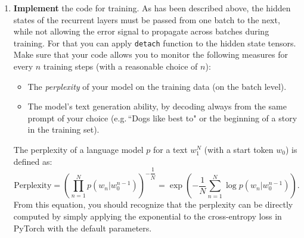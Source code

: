 \documentclass[a4paper,11pt]{article}
\begin{document}
\begin{enumerate}
\item \textbf{Implement} the code for training. As has been described above,
the hidden states of the recurrent layers must be passed from one batch to the next, while
not allowing the error signal to propagate across batches during training.
For that you can apply \texttt{detach} function to the hidden state tensors.
Make sure that your code allows you to monitor the following measures for every $n$ training steps
(with a reasonable choice of $n$):
\begin{itemize}
\item The \textit{perplexity} of your model on the training data (on the batch level).
\item The model's text generation ability, by decoding always from the same prompt of your choice
(e.g.\,``Dogs like best to" or the beginning of a story in the training set).
\end{itemize}
The perplexity of a language model $p$ for a text $w_1^N$ (with a start token $w_0$) is defined as:
\[
\text{Perplexity} = (\prod_{n=1}^{N}p(w_{n} | w_{0}^{n-1}))^{-\dfrac{1}{N}} = \exp(\displaystyle -\dfrac{1}{N}\sum_{n=1}^{N}\log p(w_{n} | w_{0}^{n-1})).
\]
From this equation, you should recognize that the perplexity can be directly computed by
simply applying the exponential to the cross-entropy loss in PyTorch with the default parameters.


\end{enumerate}
\end{document}
